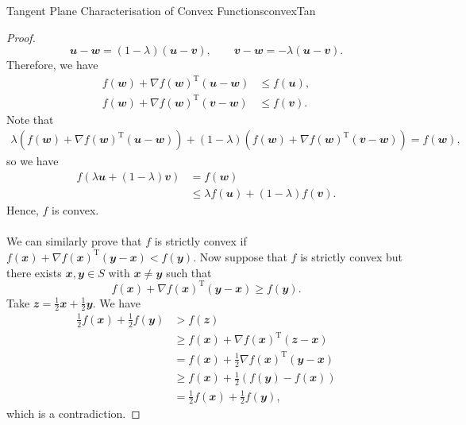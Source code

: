 \documentclass[math]{amznotes}
\theoremstyle{remark}
\begin{document}
\begin{probox}{Tangent Plane Characterisation of Convex Functions}{convexTan}
\begin{proof}
\begin{displaymath}
            \mathbfit{u - w} = (1 - \lambda)(\mathbfit{u - v}), \qquad \mathbfit{v - w} = -\lambda(\mathbfit{u - v}).
        \end{displaymath}
        Therefore, we have
        \begin{align*}
            f(\mathbfit{w}) + \nabla f(\mathbfit{w})^{\mathrm{T}}(\mathbfit{u - w}) & \leq f(\mathbfit{u}), \\
            f(\mathbfit{w}) + \nabla f(\mathbfit{w})^{\mathrm{T}}(\mathbfit{v - w}) & \leq f(\mathbfit{v}).
        \end{align*}
        Note that
        \begin{align*}
            \lambda\left(f(\mathbfit{w}) + \nabla f(\mathbfit{w})^{\mathrm{T}}(\mathbfit{u - w})\right) + (1 - \lambda)\left(f(\mathbfit{w}) + \nabla f(\mathbfit{w})^{\mathrm{T}}(\mathbfit{v - w})\right) = f(\mathbfit{w}),
        \end{align*}
        so we have
        \begin{align*}
            f(\lambda\mathbfit{u} + (1 - \lambda)\mathbfit{v}) & = f(\mathbfit{w}) \\
            & \leq \lambda f(\mathbfit{u}) + (1 - \lambda)f(\mathbfit{v}).
        \end{align*}
        Hence, $f$ is convex.
        \\\\
        We can similarly prove that $f$ is strictly convex if $f(\mathbfit{x}) + \nabla f(\mathbfit{x})^{\mathrm{T}}(\mathbfit{y - x}) < f(\mathbfit{y})$. Now suppose that $f$ is strictly convex but there exists $\mathbfit{x}, \mathbfit{y} \in S$ with $\mathbfit{x} \neq \mathbfit{y}$ such that
        \begin{equation*}
            f(\mathbfit{x}) + \nabla f(\mathbfit{x})^{\mathrm{T}}(\mathbfit{y - x}) \geq f(\mathbfit{y}).
        \end{equation*}
        Take $\mathbfit{z} = \frac{1}{2}\mathbfit{x} + \frac{1}{2}\mathbfit{y}$. We have
        \begin{align*}
            \frac{1}{2}f(\mathbfit{x}) + \frac{1}{2}f(\mathbfit{y}) & > f(\mathbfit{z}) \\
            & \geq f(\mathbfit{x}) + \nabla f(\mathbfit{x})^{\mathrm{T}}(\mathbfit{z - x}) \\
            & = f(\mathbfit{x}) + \frac{1}{2}\nabla f(\mathbfit{x})^{\mathrm{T}}\left(\mathbfit{y - x}\right) \\
            & \geq f(\mathbfit{x}) + \frac{1}{2}\left(f(\mathbfit{y}) - f(\mathbfit{x})\right) \\
            & = \frac{1}{2}f(\mathbfit{x}) + \frac{1}{2}f(\mathbfit{y}),
        \end{align*}
        which is a contradiction.
    \end{proof}
\end{probox}
\end{document}
